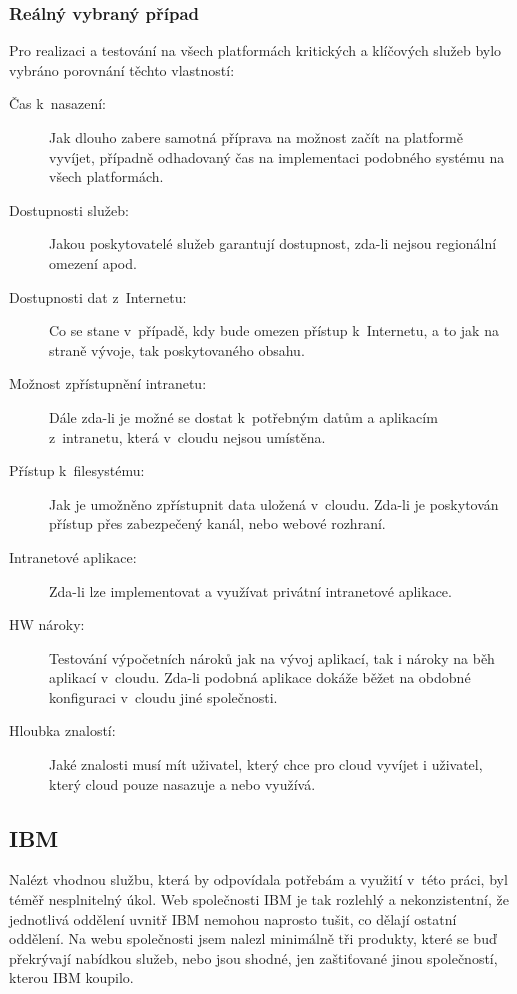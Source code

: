 \subsubsection{Reálný vybraný případ}
Pro realizaci a testování na všech platformách kritických a klíčových služeb bylo vybráno porovnání těchto vlastností:
\begin{description}
	\item [Čas k~nasazení:] Jak dlouho zabere samotná příprava na možnost začít na platformě vyvíjet, případně odhadovaný čas na implementaci podobného systému na všech platformách.
	\item [Dostupnosti služeb:] Jakou poskytovatelé služeb garantují dostupnost, zda-li nejsou regionální omezení apod.
	\item [Dostupnosti dat z~Internetu:] Co se stane v~případě, kdy bude omezen přístup k~Internetu, a to jak na straně vývoje, tak poskytovaného obsahu.
	\item [Možnost zpřístupnění intranetu:] Dále zda-li je možné se dostat k~potřebným datům a aplikacím z~intranetu, která v~cloudu nejsou umístěna.
	\item [Přístup k~filesystému:] Jak je umožněno zpřístupnit data uložená v~cloudu. Zda-li je poskytován přístup přes zabezpečený kanál, nebo webové rozhraní.
	\item [Intranetové aplikace:] Zda-li lze implementovat a využívat privátní intranetové aplikace.
	\item [HW nároky:] Testování výpočetních nároků jak na vývoj aplikací, tak i nároky na běh aplikací v~cloudu. Zda-li podobná aplikace dokáže běžet na obdobné konfiguraci v~cloudu jiné společnosti.
	\item [Hloubka znalostí:] Jaké znalosti musí mít uživatel, který chce pro cloud vyvíjet i uživatel, který cloud pouze nasazuje a nebo využívá.
\end{description}

\subsection{IBM}
Nalézt vhodnou službu, která by odpovídala potřebám a využití v~této práci, byl téměř nesplnitelný úkol. Web společnosti IBM je tak rozlehlý a nekonzistentní, že jednotlivá oddělení uvnitř IBM nemohou naprosto tušit, co dělají ostatní oddělení. Na webu společnosti jsem nalezl minimálně tři produkty, které se buď překrývají nabídkou služeb, nebo jsou shodné, jen zaštiťované jinou společností, kterou IBM koupilo.

